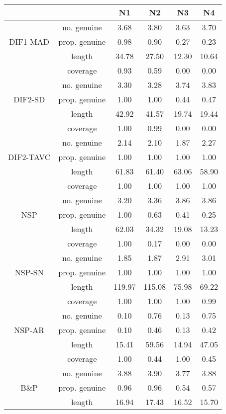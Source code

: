 \begin{tabular}{|c|c|c|c|c|c|}
  \hline
 &  & N1 & N2 & N3 & N4 \\ 
  \hline
 & no. genuine & 3.68 & 3.80 & 3.63 & 3.70 \\ 
  DIF1-MAD & prop. genuine & 0.98 & 0.90 & 0.27 & 0.23 \\ 
   & length & 34.78 & 27.50 & 12.30 & 10.64 \\ 
   & coverage & 0.93 & 0.59 & 0.00 & 0.00 \\ 
   & no. genuine & 3.30 & 3.28 & 3.74 & 3.83 \\ 
  DIF2-SD & prop. genuine & 1.00 & 1.00 & 0.44 & 0.47 \\ 
   & length & 42.92 & 41.57 & 19.74 & 19.44 \\ 
   & coverage & 1.00 & 0.99 & 0.00 & 0.00 \\ 
   & no. genuine & 2.14 & 2.10 & 1.87 & 2.27 \\ 
  DIF2-TAVC & prop. genuine & 1.00 & 1.00 & 1.00 & 1.00 \\ 
   & length & 61.83 & 61.40 & 63.06 & 58.90 \\ 
   & coverage & 1.00 & 1.00 & 1.00 & 1.00 \\ 
   & no. genuine & 3.20 & 3.36 & 3.86 & 3.86 \\ 
  NSP & prop. genuine & 1.00 & 0.63 & 0.41 & 0.25 \\ 
   & length & 62.03 & 34.32 & 19.08 & 13.23 \\ 
   & coverage & 1.00 & 0.17 & 0.00 & 0.00 \\ 
   & no. genuine & 1.85 & 1.87 & 2.91 & 3.01 \\ 
  NSP-SN & prop. genuine & 1.00 & 1.00 & 1.00 & 1.00 \\ 
   & length & 119.97 & 115.08 & 75.98 & 69.22 \\ 
   & coverage & 1.00 & 1.00 & 1.00 & 0.99 \\ 
   & no. genuine & 0.10 & 0.76 & 0.13 & 0.75 \\ 
  NSP-AR & prop. genuine & 0.10 & 0.46 & 0.13 & 0.42 \\ 
   & length & 15.41 & 59.56 & 14.94 & 47.05 \\ 
   & coverage & 1.00 & 0.44 & 1.00 & 0.45 \\ 
   & no. genuine & 3.88 & 3.90 & 3.77 & 3.88 \\ 
  B\&P & prop. genuine & 0.96 & 0.96 & 0.54 & 0.57 \\ 
   & length & 16.94 & 17.43 & 16.52 & 15.70 \\ 

\end{tabular}
